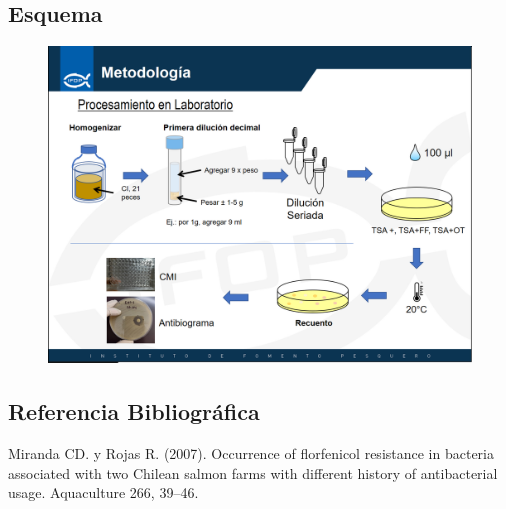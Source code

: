 \documentclass[
  letterpaper,
  DIV=11,
  numbers=noendperiod]{scrartcl}
\begin{document}
\hypertarget{esquema}{%
\subsection{Esquema}\label{esquema}}

\begin{figure}

{\centering \includegraphics{images/Esquema.png}

}

\end{figure}

\hypertarget{referencia-bibliogruxe1fica}{%
\subsection{Referencia
Bibliográfica}\label{referencia-bibliogruxe1fica}}

Miranda CD. y Rojas R. (2007). Occurrence of florfenicol resistance in
bacteria associated with two Chilean salmon farms with different history
of antibacterial usage. Aquaculture 266, 39--46.
\end{document}
